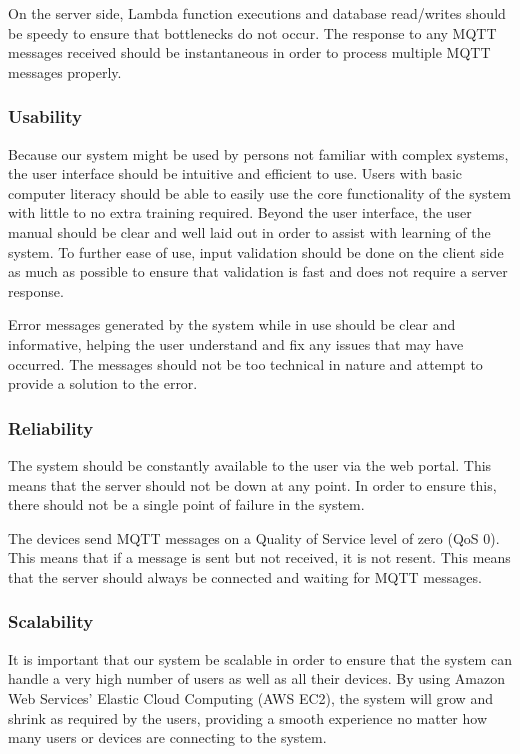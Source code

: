 \documentclass{article}
\begin{document}
			On the server side, Lambda function executions and database read/writes should be speedy to ensure that bottlenecks do not occur. The response to any MQTT messages received should be instantaneous in order to process multiple MQTT messages properly.
			
		\subsubsection{Usability}
			Because our system might be used by persons not familiar with complex systems, the user interface should be intuitive and efficient to use. Users with basic computer literacy should be able to easily use the core functionality of the system with little to no extra training required. Beyond the user interface, the user manual should be clear and well laid out in order to assist with learning of the system. To further ease of use, input validation should be done on the client side as much as possible to ensure that validation is fast and does not require a server response.
			
			Error messages generated by the system while in use should be clear and informative, helping the user understand and fix any issues that may have occurred. The messages should not be too technical in nature and attempt to provide a solution to the error.
			
		\subsubsection{Reliability}
			The system should be constantly available to the user via the web portal. This means that the server should not be down at any point. In order to ensure this, there should not be a single point of failure in the system.
			
			The devices send MQTT messages on a Quality of Service level of zero (QoS 0). This means that if a message is sent but not received, it is not resent. This means that the server should always be connected and waiting for MQTT messages.
			
		\subsubsection{Scalability}
			It is important that our system be scalable in order to ensure that the system can handle a very high number of users as well as all their devices. By using Amazon Web Services' Elastic Cloud Computing (AWS EC2), the system will grow and shrink as required by the users, providing a smooth experience no matter how many users or devices are connecting to the system.
			
\end{document}
